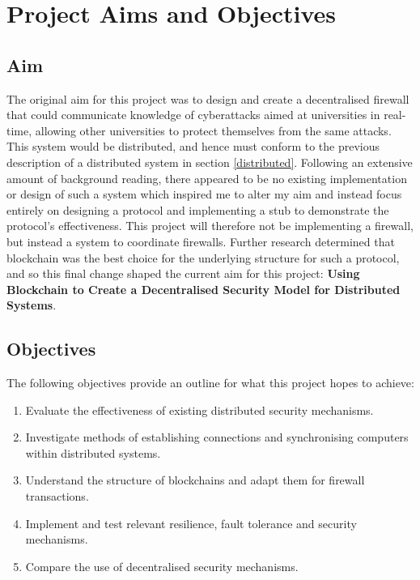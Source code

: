 \documentclass[a4paper, 11pt]{report}
\begin{document}
\chapter{Project Aims and Objectives}

\section{Aim} \label{aim}
The original aim for this project was to design and create a decentralised firewall that could communicate knowledge of cyberattacks aimed at universities in real-time, allowing other universities to protect themselves from the same attacks. This system would be distributed, and hence must conform to the previous description of a distributed system in section \ref{distributed}. Following an extensive amount of background reading, there appeared to be no existing implementation or design of such a system which inspired me to alter my aim and instead focus entirely on designing a protocol and implementing a \gls{stub} to demonstrate the protocol's effectiveness. This project will therefore not be implementing a firewall, but instead a system to coordinate firewalls. Further research determined that \gls{blockchain} was the best choice for the underlying structure for such a protocol, and so this final change shaped the current aim for this project: \textbf{Using Blockchain to Create a Decentralised Security Model for Distributed Systems}.

\section{Objectives}
The following objectives provide an outline for what this project hopes to achieve:

\begin{enumerate}
    \item Evaluate the effectiveness of existing distributed security mechanisms.
    \item Investigate methods of establishing connections and synchronising computers within distributed systems.
    \item Understand the structure of \gls{blockchain}s and adapt them for firewall transactions.
    \item Implement and test relevant resilience, fault tolerance and security mechanisms.
    \item Compare the use of decentralised security mechanisms.
\end{enumerate}
\end{document}
